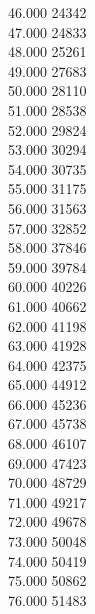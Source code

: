 { 46.000	24342 \\
 47.000	24833 \\
 48.000	25261 \\
 49.000	27683 \\
 50.000	28110 \\
 51.000	28538 \\
 52.000	29824 \\
 53.000	30294 \\
 54.000	30735 \\
 55.000	31175 \\
 56.000	31563 \\
 57.000	32852 \\
 58.000	37846 \\
 59.000	39784 \\
 60.000	40226 \\
 61.000	40662 \\
 62.000	41198 \\
 63.000	41928 \\
 64.000	42375 \\
 65.000	44912 \\
 66.000	45236 \\
 67.000	45738 \\
 68.000	46107 \\
 69.000	47423 \\
 70.000	48729 \\
 71.000	49217 \\
 72.000	49678 \\
 73.000	50048 \\
 74.000	50419 \\
 75.000	50862 \\
 76.000	51483 \\
}
